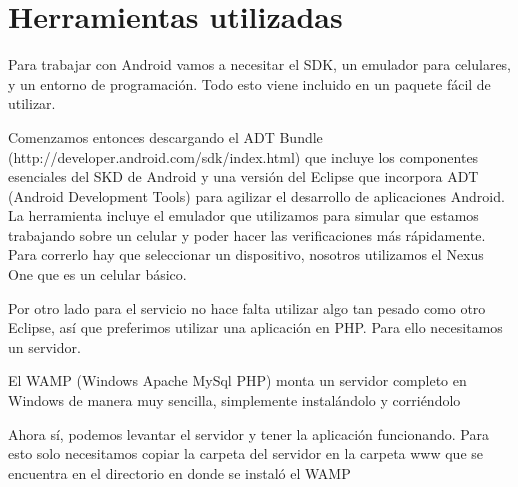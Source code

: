 \section{Herramientas utilizadas}

Para trabajar con Android vamos a necesitar el SDK, un emulador para celulares, y un entorno de programación. Todo esto viene incluido en un paquete fácil de utilizar.

Comenzamos entonces descargando el ADT Bundle (http://developer.android.com/sdk/index.html) que incluye los componentes esenciales del SKD de Android y una versión del Eclipse que incorpora ADT (Android Development Tools) para agilizar el desarrollo de aplicaciones Android. La herramienta incluye el emulador que utilizamos para simular que estamos trabajando sobre un celular y poder hacer las verificaciones más rápidamente. Para correrlo hay que seleccionar un dispositivo, nosotros utilizamos el Nexus One que es un celular básico.

Por otro lado para el servicio no hace falta utilizar algo tan pesado como otro Eclipse, así que preferimos utilizar una aplicación en PHP. Para ello necesitamos un servidor.

El WAMP (Windows Apache MySql PHP) monta un servidor completo en Windows de manera muy sencilla, simplemente instalándolo y corriéndolo

Ahora sí, podemos levantar el servidor y tener la aplicación funcionando. Para esto solo necesitamos copiar la carpeta del servidor en la carpeta www que se encuentra en el directorio en donde se instaló el WAMP
